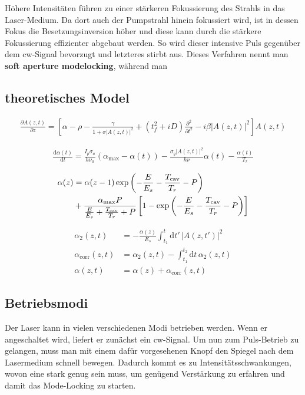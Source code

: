 \documentclass[bachelor,       %
               twoside,        %
               BCOR10mm,       %
               english,ngerman, %
               ]{GAUBM}
\newcommand{\dif}{\ensuremath{\mathrm{d}}}
\begin{document}
Höhere Intensitäten führen zu einer stärkeren Fokussierung des Strahls in das Laser-Medium.
Da dort auch der Pumpstrahl hinein fokussiert wird, ist in dessen Fokus die Besetzungsinversion höher und diese kann durch die stärkere Fokussierung effizienter abgebaut werden.
So wird dieser intensive Puls gegenüber dem cw-Signal bevorzugt und letzteres stirbt aus.
Dieses Verfahren nennt man \textbf{soft aperture modelocking}, während man 

\subsection{theoretisches Model}

\begin{align}
	\frac{\partial A(z,t)}{\partial z}=\left[\alpha-\rho-\frac{\gamma}{1+\sigma|A(z,t)|^2}+(t_f^2+iD)\frac{\partial^2}{\partial t^2}-i\beta |A(z,t)|^2\right]A(z,t)
\end{align}


\begin{align}
	\frac{\dif \alpha(t)}{\dif t}=\frac{I_p\sigma_a}{h\nu_a}(\alpha_\text{max}-\alpha(t))-\frac{\sigma_g|A(z,t)|^2}{h\nu}\alpha(t)-\frac{\alpha(t)}{T_r}
\end{align}

\begin{align}
	\alpha(z)&=\alpha(z-1)\exp\left(-\frac{E}{E_s}-\frac{T_\text{cav}}{T_r}-P\right) \notag \\
	&+\frac{\alpha_\text{max}P}{\frac{E}{E_s}+\frac{T_\text{cav}}{T_r}+P}\left[1-\exp\left(-\frac{E}{E_s}-\frac{T_\text{cav}}{T_r}-P\right)\right]
\end{align}

\begin{align}
	\alpha_2(z,t)&=-\frac{\alpha(z)}{E_s}\int_{t_1}^{t} \dif t'\, |A(z,t')|^2\\
	\alpha_\text{corr}(z,t)&=\alpha_2(z,t)-\int_{t_1}^{t_2} \dif t\, \alpha_2(z,t)\\
	\alpha(z,t)&=\alpha(z)+\alpha_\text{corr}(z,t)
\end{align}

\subsection{Betriebsmodi}
Der Laser kann in vielen verschiedenen Modi betrieben werden.
Wenn er angeschaltet wird, liefert er zunächst ein cw-Signal.
Um nun zum Puls-Betrieb zu gelangen, muss man mit einem dafür vorgesehenen Knopf den Spiegel nach dem Lasermedium schnell bewegen.
Dadurch kommt es zu Intensitätsschwankungen, wovon eine stark genug sein muss, um genügend Verstärkung zu erfahren und damit das Mode-Locking zu starten.
\end{document}
